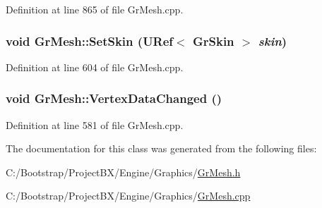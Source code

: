 Definition at line 865 of file GrMesh.cpp.\hypertarget{class_gr_mesh_ca24f02b9e2cf3342a81f9ee1493f6ea}{
\subsubsection[{SetSkin}]{\setlength{\rightskip}{0pt plus 5cm}void GrMesh::SetSkin ({\bf URef}$<$ {\bf GrSkin} $>$ {\em skin})}}
\label{class_gr_mesh_ca24f02b9e2cf3342a81f9ee1493f6ea}




Definition at line 604 of file GrMesh.cpp.\hypertarget{class_gr_mesh_a3a4f0ec27a7c9484f2dc57363030c24}{
\subsubsection[{VertexDataChanged}]{\setlength{\rightskip}{0pt plus 5cm}void GrMesh::VertexDataChanged ()}}
\label{class_gr_mesh_a3a4f0ec27a7c9484f2dc57363030c24}




Definition at line 581 of file GrMesh.cpp.

The documentation for this class was generated from the following files:\begin{CompactItemize}
\item 
C:/Bootstrap/ProjectBX/Engine/Graphics/\hyperlink{_gr_mesh_8h}{GrMesh.h}\item 
C:/Bootstrap/ProjectBX/Engine/Graphics/\hyperlink{_gr_mesh_8cpp}{GrMesh.cpp}\end{CompactItemize}
